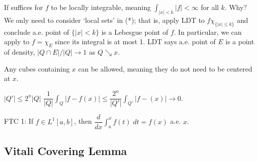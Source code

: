 If suffices for $f$ to be locally integrable, meaning $\int_{|x|<k} |f|<\infty$ for all $k$. Why? We only need to consider `local sets' in (*); that is, apply LDT to $f \chi_{\{|x|\leq k\}}$ and conclude a.e. point of $\{|x|<k\}$ is a Lebesgue point of $f$. In particular, we can apply to $f= \chi_E$ since its integral is at most 1. LDT says a.e. point of $E$ is a point of density, $|Q \cap E|/|Q| \to 1$ as $Q \searrow x$. 


Any cubes containing $x$ can be allowed, meaning they do not need to be centered at $x$.


$|Q'| \leq 2^n |Q|$
$\dfrac{1}{|Q|} \int_Q |f-f(x)| \leq \dfrac{2^n}{|Q'|} \int_{Q'} |f-(x)| \to 0$. 




FTC 1: If $f \in L^1[a,b]$, then $\dfrac{d}{dx} \int_a^x f(t) \;dt= f(x)$ a.e. $x$.  














\subsection{Vitali Covering Lemma}


